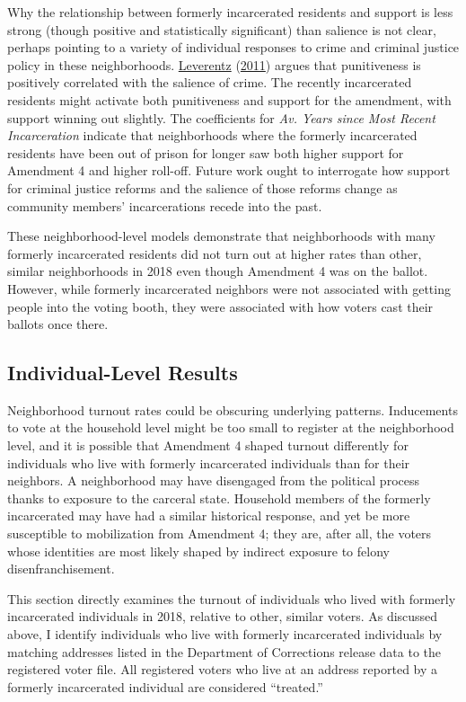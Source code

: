 \documentclass[
  12pt,
]{article}
\begin{document}
Why the relationship between formerly incarcerated residents and support is less strong (though positive and statistically significant) than salience is not clear, perhaps pointing to a variety of individual responses to crime and criminal justice policy in these neighborhoods. \protect\hyperlink{ref-Leverentz2011}{Leverentz} (\protect\hyperlink{ref-Leverentz2011}{2011}) argues that punitiveness is positively correlated with the salience of crime. The recently incarcerated residents might activate both punitiveness and support for the amendment, with support winning out slightly. The coefficients for \emph{Av. Years since Most Recent Incarceration} indicate that neighborhoods where the formerly incarcerated residents have been out of prison for longer saw both higher support for Amendment 4 and higher roll-off. Future work ought to interrogate how support for criminal justice reforms and the salience of those reforms change as community members' incarcerations recede into the past.

These neighborhood-level models demonstrate that neighborhoods with many formerly incarcerated residents did not turn out at higher rates than other, similar neighborhoods in 2018 even though Amendment 4 was on the ballot. However, while formerly incarcerated neighbors were not associated with getting people into the voting booth, they were associated with how voters cast their ballots once there.

\hypertarget{individual-level-results}{%
\subsection*{Individual-Level Results}\label{individual-level-results}}

Neighborhood turnout rates could be obscuring underlying patterns. Inducements to vote at the household level might be too small to register at the neighborhood level, and it is possible that Amendment 4 shaped turnout differently for individuals who live with formerly incarcerated individuals than for their neighbors. A neighborhood may have disengaged from the political process thanks to exposure to the carceral state. Household members of the formerly incarcerated may have had a similar historical response, and yet be more susceptible to mobilization from Amendment 4; they are, after all, the voters whose identities are most likely shaped by indirect exposure to felony disenfranchisement.

This section directly examines the turnout of individuals who lived with formerly incarcerated individuals in 2018, relative to other, similar voters. As discussed above, I identify individuals who live with formerly incarcerated individuals by matching addresses listed in the Department of Corrections release data to the registered voter file. All registered voters who live at an address reported by a formerly incarcerated individual are considered ``treated.''
\end{document}
